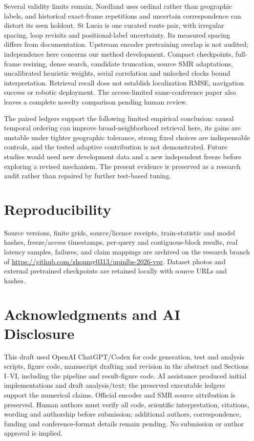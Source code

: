 \documentclass[conference]{IEEEtran}
\begin{document}
Several validity limits remain. Nordland uses ordinal rather than geographic labels, and historical exact-frame repetitions and uncertain correspondence can distort its seen holdout. St Lucia is one curated route pair, with irregular spacing, loop revisits and positional-label uncertainty. Its measured spacing differs from documentation. Upstream encoder pretraining overlap is not audited; independence here concerns our method development. Compact checkpoints, full-frame resizing, dense search, candidate truncation, source SMR adaptations, uncalibrated heuristic weights, serial correlation and unlocked clocks bound interpretation. Retrieval recall does not establish localization RMSE, navigation success or robotic deployment. The access-limited same-conference paper also leaves a complete novelty comparison pending human review.

The paired ledgers support the following limited empirical conclusion: causal temporal ordering can improve broad-neighborhood retrieval here, its gains are unstable under tighter geographic tolerance, strong fixed choices are indispensable controls, and the tested adaptive contribution is not demonstrated. Future studies would need new development data and a new independent freeze before exploring a revised mechanism. The present evidence is preserved as a research audit rather than repaired by further test-based tuning.

\section*{Reproducibility}

Source versions, finite grids, source/licence receipts, train-statistic and model hashes, freeze/access timestamps, per-query and contiguous-block results, real latency samples, failures, and claim mappings are archived on the research branch of \url{https://github.com/zhoumy0313/upinlbs-2026-vpr}. Dataset photos and external pretrained checkpoints are retained locally with source URLs and hashes. \section*{Acknowledgments and AI Disclosure}
This draft used OpenAI ChatGPT/Codex for code generation, test and analysis scripts, figure code, manuscript drafting and revision in the abstract and Sections I--VI, including the pipeline and result-figure code. AI assistance produced initial implementations and draft analysis/text; the preserved executable ledgers support the numerical claims. Official encoder and SMR source attribution is preserved. Human authors must verify all code, scientific interpretation, citations, wording and authorship before submission; additional authors, correspondence, funding and conference-format details remain pending. No submission or author approval is implied.
\end{document}
